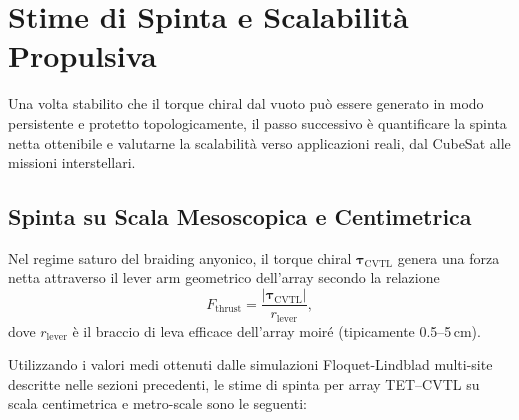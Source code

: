 \documentclass[11pt,a4paper]{article}
\theoremstyle{plain}
\theoremstyle{definition}
\begin{document}
\vspace{0.3cm}






\section{Stime di Spinta e Scalabilità Propulsiva}

Una volta stabilito che il torque chiral dal vuoto può essere generato in modo persistente e protetto topologicamente, il passo successivo è quantificare la spinta netta ottenibile e valutarne la scalabilità verso applicazioni reali, dal CubeSat alle missioni interstellari.

\subsection{Spinta su Scala Mesoscopica e Centimetrica}

Nel regime saturo del braiding anyonico, il torque chiral $\boldsymbol{\tau}_{\text{CVTL}}$ genera una forza netta attraverso il lever arm geometrico dell’array secondo la relazione
\begin{equation}
F_{\text{thrust}} = \frac{|\boldsymbol{\tau}_{\text{CVTL}}|}{r_{\text{lever}}},
\label{eq:thrust_from_torque}
\end{equation}
dove $r_{\text{lever}}$ è il braccio di leva efficace dell’array moiré (tipicamente 0.5–5\,cm).

\vspace{0.2cm}

Utilizzando i valori medi ottenuti dalle simulazioni Floquet-Lindblad multi-site descritte nelle sezioni precedenti, le stime di spinta per array TET--CVTL su scala centimetrica e metro-scale sono le seguenti:
\end{document}

